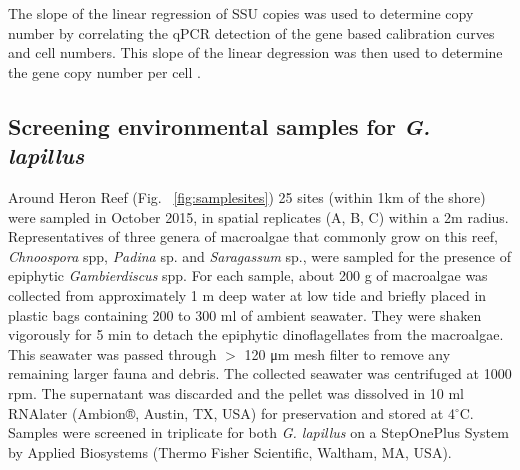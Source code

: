 \documentclass[12pt]{article}
\begin{document}
The slope of the linear regression of SSU copies was used to determine copy number by correlating the qPCR detection of the gene based calibration curves and cell numbers.
This slope of the linear degression was then used to determine the gene copy number per cell \cite{kon2015spatial}.

\subsection*{Screening environmental samples for \emph{G. lapillus}}
\FloatBarrier
Around Heron Reef (Fig. ~\ref{fig:samplesites}) 25 sites (within 1km of the shore) were sampled in October 2015, in spatial replicates (A, B, C) within a 2m radius. 
Representatives of three genera of macroalgae that commonly grow on this reef, \textit{Chnoospora} spp, \textit{Padina} sp. and \textit{Saragassum} sp., were sampled for the presence of epiphytic \emph{Gambierdiscus} spp. For each sample, about 200 g of macroalgae was collected from approximately 1 m deep water at low tide and briefly placed in plastic bags containing 200 to 300 ml of ambient seawater. 
They were shaken vigorously for 5 min to detach the epiphytic dinoflagellates from the macroalgae. 
This seawater was passed through $>$ 120 μm mesh filter to remove any remaining larger fauna and debris. 
The collected seawater was centrifuged at 1000 rpm. The supernatant was discarded and the pellet was dissolved in 10 ml RNAlater (Ambion®, Austin, TX, USA) for preservation and stored at 4$^{\circ}$C.
Samples were screened in triplicate for both \emph{G. lapillus} %
on a StepOnePlus System by Applied Biosystems (Thermo Fisher Scientific, Waltham, MA, USA).
\end{document}
